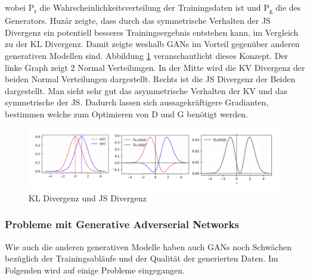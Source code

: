\documentclass{llncs}
\begin{document}
wobei P\textsubscript{r} die Wahrscheinlichkeitsverteilung der Trainingsdaten ist und P\textsubscript{g} die des Generators. Huzár \cite{sha} zeigte, dass durch das symmetrische Verhalten der JS Divergenz ein potentiell besseres Trainingsergebnis entstehen kann, im Vergleich zu der KL Divergenz. Damit zeigte weshalb GANs im Vorteil gegenüber anderen generativen Modellen sind.  Abbildung \ref{fig:Bild7} veranschautlicht dieses Konzept.  Der linke Graph zeigt 2 Normal Verteilungen. In der Mitte wird die KV Divergenz der beiden Normal Verteilungen dargestellt.  Rechts ist die JS Divergenz der Beiden dargestellt. Man sieht sehr gut das asymmetrische Verhalten der KV und das symmetrische der JS. Dadurch lassen sich aussagekräftigere Gradianten, bestimmen welche zum Optimieren von D und G benötigt werden\cite{sha}. 
 
\begin{figure}
	\centering
	\includegraphics[width=1.0\linewidth]{KLdiv}
	\caption{KL Divergenz und JS Divergenz}
	\label{fig:Bild7}
\end{figure}

\newpage
\subsubsection{Probleme mit Generative Adverserial Networks}

Wie auch die anderen generativen Modelle haben auch  GANs noch Schwächen bezüglich der Trainingsabläufe und der Qualität der generierten Daten. Im Folgenden wird auf einige Probleme eingegangen.
\end{document}

